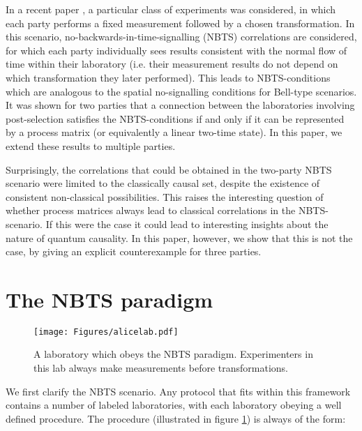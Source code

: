 \documentclass[aps,pra, twocolumn]{revtex4-1}
\begin{document}
In a recent paper \cite{polytope}, a particular class of experiments was considered, in which each party performs a fixed measurement followed by a chosen transformation. In this scenario,  no-backwards-in-time-signalling (NBTS) correlations are considered, for which each party individually sees results consistent with the normal flow of time within their laboratory (i.e. their measurement results do not depend on which transformation they later performed). This leads to NBTS-conditions which are analogous to the spatial no-signalling conditions for Bell-type scenarios. It was  shown for two parties that a connection between the laboratories involving post-selection satisfies the NBTS-conditions if and only if it can be represented by a process matrix (or equivalently a linear two-time state). In this paper, we extend these results to multiple parties. 

Surprisingly, the correlations that could be obtained in the two-party NBTS scenario were limited to the classically causal set, despite the existence of consistent non-classical possibilities. This raises the interesting question of whether process matrices always lead to classical correlations in the NBTS-scenario. If this were the case it could lead to interesting insights about the nature of quantum causality. In this paper, however, we show that this is not the case, by giving an explicit counterexample for three parties.  


\section{The NBTS paradigm}
\begin{figure}
\centering 
\texttt{[image: Figures/alicelab.pdf]}
\caption{A laboratory which obeys the NBTS paradigm. Experimenters in this lab always make measurements before transformations.\label{fig:NBTS-scenario}}
\end{figure}
We first clarify the NBTS scenario. Any protocol that fits within this framework contains a number of labeled laboratories, with each laboratory obeying a well defined procedure. The procedure (illustrated in figure \ref{fig:NBTS-scenario}) is always of the form:
\end{document}
